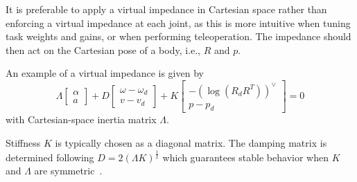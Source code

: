 \documentclass[a4paper, 10pt, conference]{ieeeconf}
\begin{document}
    It is preferable to apply a virtual impedance in Cartesian space rather than enforcing a virtual impedance at each joint, as this is more intuitive when tuning task weights and gains, or when performing teleoperation. The impedance should then act on the Cartesian pose of a body, i.e., $R$ and $p$. 

    An example of a virtual impedance is given by
    \begin{equation} \label{eq:impedance_desired}
    \Lambda  \begin{bmatrix} \alpha   \\ a  \end{bmatrix} + D \begin{bmatrix} \omega - {\omega_d} \\ v - v_d \end{bmatrix}+ K \begin{bmatrix} -(\log({R}_dR^T))^{\vee } \\p - {p_d}\end{bmatrix} = 0
    \end{equation}
    with Cartesian-space inertia matrix $\Lambda$. 

    Stiffness $K$ is typically chosen as a diagonal matrix. The damping matrix is determined following $D = 2(\Lambda K)^{\frac{1}{2}}$ which guarantees stable behavior when $K$ and $\Lambda$ are symmetric~\cite{albu-schafferCartesianImpedanceControl2003}. 
\end{document}
